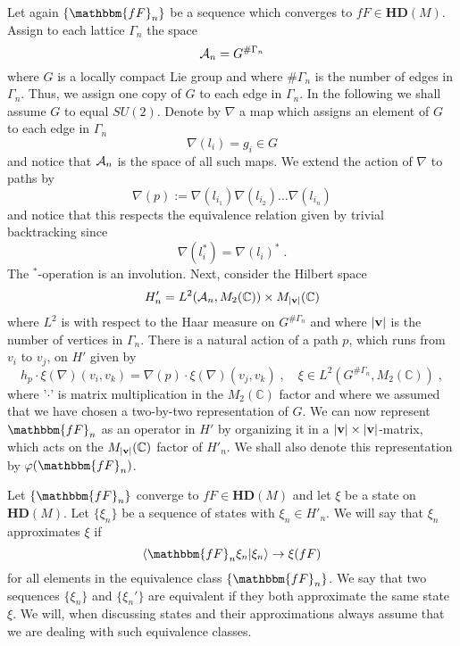 \documentclass[12pt]{article}
\def\x{\xi}
\def\G{\Gamma}
\def\ca{{\cal A}}
\begin{document}
Let again $\{\mathbbm{fF}_n\}$ be a sequence which converges to $fF\in \mathbf{HD}(M) $. Assign to each lattice $\G_n$ the space
$$
\ca_n = G^{\# \G_n}
$$
where $G$ is a locally compact Lie group and where $\# \G_n$ is the number of edges in $\G_n$. Thus, we assign one copy of $G$ to each edge in $\G_n$. In the following we shall assume $G$ to equal $SU(2)$. %
Denote by $\nabla$ a map which assigns an element of $G$ to each edge in $\G_n$
$$
\nabla(l_i)= g_i\in G
$$
and notice that $\ca_n$ is the space of all such maps. We extend the action of $\nabla$ to paths by
$$
\nabla(p) := \nabla(l_{i_1})\nabla( l_{i_2})\ldots\nabla( l_{i_n})
$$
and notice that this respects the equivalence relation given by trivial backtracking since 
$$
\nabla(l_i^*)=\nabla(l_i)^*\;.
$$
The $^*$-operation is an involution.
Next, consider the Hilbert space%
\begin{equation}
H'_n = L^2(\ca_n,M_2(\mathbb{C}))\times M_{\vert {\bf v}\vert}(\mathbb{C})
\label{H1}
\end{equation}
where $L^2$ is with respect to the Haar measure on $G^{\# \G_n}$ and where $\vert {\bf v}\vert$ is the number of vertices in $\G_n$. There is a natural action of a path $p$, which runs from $v_i$ to $v_j$, on $H'$ given by
$$
h_p\cdot \x (\nabla) (v_i,v_k) = \nabla(p)\cdot \x (\nabla) (v_j,v_k)\;, \quad \x\in L^2(G^{\# \G_n},M_2(\mathbb{C}))\;,
$$
where '$\cdot$' is matrix multiplication in the $M_2(\mathbb{C})$ factor and where we assumed that we have chosen a two-by-two representation of $G$. 
We can now represent $\mathbbm{fF}_n$ as an operator in $H'$ by organizing it in a $\vert {\bf v}\vert \times  \vert {\bf v}\vert$-matrix, which acts on the $M_{\vert {\bf v}\vert}(\mathbb{C})$ factor of $H'_n$. We shall also denote this representation by $\varphi(\mathbbm{fF}_n)$.




Let $\{\mathbbm{fF}_n\}$ converge to $fF\in \mathbf{HD}(M) $ and let $\x$ be a state on $\mathbf{HD}(M) $. Let $\{\x_n\}$ be a sequence of states with $\x_n\in H'_n$. We will say that $\x_n$ approximates $\x$ if
$$
\langle \mathbbm{fF}_n \x_n\vert \x_n\rangle \rightarrow \x(fF)
$$
for all elements in the equivalence class $\{\mathbbm{fF}_n\}$. We say that two sequences $\{\x_n\}$ and $\{\x_n'\}$ are equivalent if they both approximate the same state $\x$. We will, when discussing states and their approximations always assume that we are dealing with such equivalence classes. %
\end{document}
